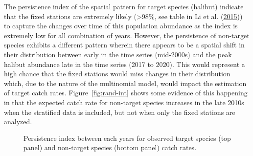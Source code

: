 \documentclass[12pt]{article}\usepackage[]{graphicx}\usepackage[]{color}
\begin{document}
The persistence index of the spatial pattern for target species (halibut) indicate that the fixed stations are extremely likely (\textgreater98\%, see table in Li et al. (\protect\hyperlink{ref-Li2015}{2015})) to capture the changes over time of this population abundance as the index is extremely low for all combination of years. However, the persistence of non-target species exhibits a different pattern wherein there appears to be a spatial shift in their distribution between early in the time series (mid-2000s) and the peak halibut abundance late in the time series (2017 to 2020). This would represent a high chance that the fixed stations would miss changes in their distribution which, due to the nature of the multinomial model, would impact the estimation of target catch rates. Figure~\ref{fig:rand-int} shows some evidence of this happening in that the expected catch rate for non-target species increases in the late 2010s when the stratified data is included, but not when only the fixed stations are analyzed.
\begin{figure}[htb]

{\centering {}  

}

\caption{Persistence index between each years for observed target species (top panel) and non-target species (bottom panel) catch rates.}\label{fig:persist}
\end{figure}
\end{document}
